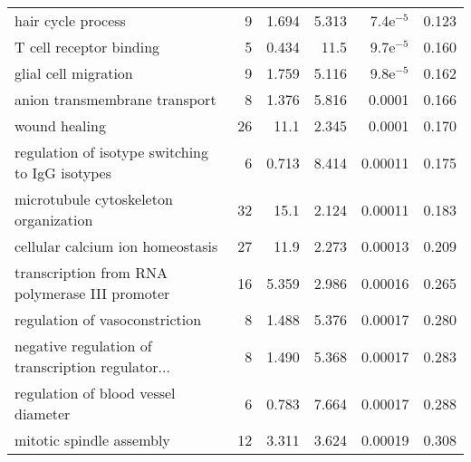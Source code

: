 \begin{longtable}{lrrrrr}
                                hair cycle process &                       9 &                   1.694 &      5.313 &          7.4e$^{-5}$ &                0.123 \\
                           T cell receptor binding &                       5 &                   0.434 &       11.5 &          9.7e$^{-5}$ &                0.160 \\
                              glial cell migration &                       9 &                   1.759 &      5.116 &          9.8e$^{-5}$ &                0.162 \\
                     anion transmembrane transport &                       8 &                   1.376 &      5.816 &               0.0001 &                0.166 \\
                                     wound healing &                      26 &                    11.1 &      2.345 &               0.0001 &                0.170 \\
   regulation of isotype switching to IgG isotypes &                       6 &                   0.713 &      8.414 &              0.00011 &                0.175 \\
             microtubule cytoskeleton organization &                      32 &                    15.1 &      2.124 &              0.00011 &                0.183 \\
                  cellular calcium ion homeostasis &                      27 &                    11.9 &      2.273 &              0.00013 &                0.209 \\
    transcription from RNA polymerase III promoter &                      16 &                   5.359 &      2.986 &              0.00016 &                0.265 \\
                    regulation of vasoconstriction &                       8 &                   1.488 &      5.376 &              0.00017 &                0.280 \\
 negative regulation of transcription regulator... &                       8 &                   1.490 &      5.368 &              0.00017 &                0.283 \\
               regulation of blood vessel diameter &                       6 &                   0.783 &      7.664 &              0.00017 &                0.288 \\
                          mitotic spindle assembly &                      12 &                   3.311 &      3.624 &              0.00019 &                0.308 \\

\end{longtable}
